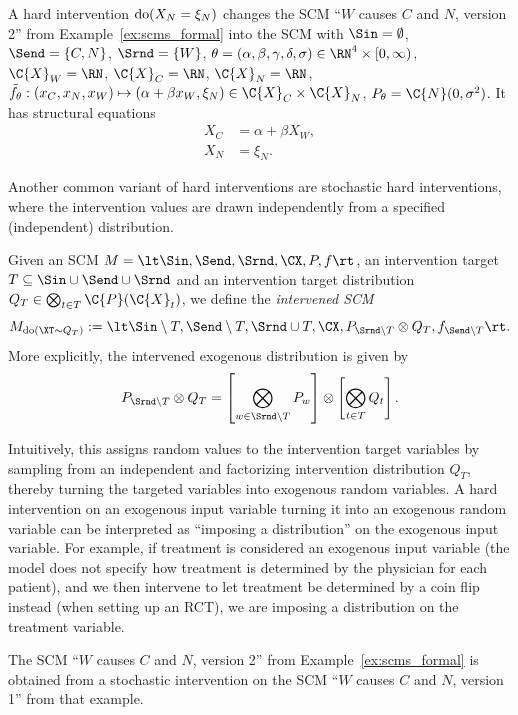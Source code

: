 \begin{Eg}
  A hard intervention $\operatorname{do}(X_N=\xi_N)$ changes the SCM ``$W$ causes $C$ and $N$, version 2'' from Example~\ref{ex:scms_formal} into the SCM with
  $\Sin = \emptyset$, $\Send = \{C,N\}$, $\Srnd = \{W\}$, $\theta = (\alpha,\beta,\gamma,\delta,\sigma) \in \RN^4 \times [0,\infty)$, 
  $\C{X}_W = \RN$, $\C{X}_C = \RN$, $\C{X}_N = \RN$, $\tilde{f}_\theta : (x_C, x_N, x_W) \mapsto (\alpha + \beta x_W, \xi_N) \in \C{X}_C \times \C{X}_N$, $P_\theta = \C{N}(0,\sigma^2)$.
  It has structural equations
      \begin{align*}
        X_C & = \alpha + \beta X_W, \\
        X_N & = \xi_N.
      \end{align*}
\end{Eg}

Another common variant of hard interventions are stochastic hard interventions, where the intervention
values are drawn independently from a specified (independent) distribution.
\begin{Def}\label{def:scm_hard_intervention_stochastic}
  Given an SCM $M = \lt \Sin, \Send, \Srnd, \CX, P, f \rt$, an intervention target $T \subseteq \Sin \cup \Send \cup \Srnd$ 
  and an intervention target distribution $Q_T \in \bigotimes_{t\in T} \C{P}(\C{X}_t)$, we define the \emph{intervened SCM}
  $$M_{\doit(\XT\sim Q_T)} := \lt \Sin\setminus T,\Send\setminus T,\Srnd \cup T,\CX,P_{\Srnd\setminus T} \otimes Q_T,f_{\Send\setminus T} \rt.$$
  More explicitly, the intervened exogenous distribution is given by
  $$P_{\Srnd\setminus T} \otimes Q_T = \left[\bigotimes_{w \in \Srnd\setminus T} P_w\right] \otimes \left[\bigotimes_{t \in T} Q_t\right].$$
\end{Def}
Intuitively, this assigns random values to the intervention target variables
by sampling from an independent and factorizing intervention distribution $Q_T$, thereby
turning the targeted variables into exogenous random variables.
A hard intervention on an exogenous input variable turning it into an exogenous random variable
can be interpreted as ``imposing a distribution'' on the exogenous input variable.
For example, if treatment is considered an exogenous input variable (the model does not specify 
how treatment is determined by the physician for each patient), and we then intervene to let 
treatment be determined by a coin flip instead (when setting up an RCT),
we are imposing a distribution on the treatment variable.
\begin{Eg}
  The SCM ``$W$ causes $C$ and $N$, version 2'' from Example~\ref{ex:scms_formal} is obtained from 
  a stochastic intervention on the SCM ``$W$ causes $C$ and $N$, version 1'' from that example.
\end{Eg}

